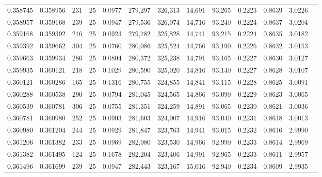 \begin{tabular}{rrrrrrrrrrrrr}
0.358745 & 0.358956 &   231 &  25 &                                     0.0977 & 279,297 & 326,313 &  14,691 &  93,265 & 0.2223 & 0.8639 & 3.0226 \\
0.358957 & 0.359168 &   239 &  25 &                                     0.0947 & 279,536 & 326,074 &  14,716 &  93,240 & 0.2224 & 0.8637 & 3.0204 \\
0.359168 & 0.359392 &   246 &  25 &                                     0.0923 & 279,782 & 325,828 &  14,741 &  93,215 & 0.2224 & 0.8635 & 3.0182 \\
0.359392 & 0.359662 &   304 &  25 &                                     0.0760 & 280,086 & 325,524 &  14,766 &  93,190 & 0.2226 & 0.8632 & 3.0153 \\
0.359663 & 0.359934 &   286 &  25 &                                     0.0804 & 280,372 & 325,238 &  14,791 &  93,165 & 0.2227 & 0.8630 & 3.0127 \\
0.359935 & 0.360121 &   218 &  25 &                                     0.1029 & 280,590 & 325,020 &  14,816 &  93,140 & 0.2227 & 0.8628 & 3.0107 \\
0.360121 & 0.360286 &   165 &  25 &                                     0.1316 & 280,755 & 324,855 &  14,841 &  93,115 & 0.2228 & 0.8625 & 3.0091 \\
0.360288 & 0.360538 &   290 &  25 &                                     0.0794 & 281,045 & 324,565 &  14,866 &  93,090 & 0.2229 & 0.8623 & 3.0065 \\
0.360539 & 0.360781 &   306 &  25 &                                     0.0755 & 281,351 & 324,259 &  14,891 &  93,065 & 0.2230 & 0.8621 & 3.0036 \\
0.360781 & 0.360980 &   252 &  25 &                                     0.0903 & 281,603 & 324,007 &  14,916 &  93,040 & 0.2231 & 0.8618 & 3.0013 \\
0.360980 & 0.361204 &   244 &  25 &                                     0.0929 & 281,847 & 323,763 &  14,941 &  93,015 & 0.2232 & 0.8616 & 2.9990 \\
0.361206 & 0.361382 &   233 &  25 &                                     0.0969 & 282,080 & 323,530 &  14,966 &  92,990 & 0.2233 & 0.8614 & 2.9969 \\
0.361382 & 0.361495 &   124 &  25 &                                     0.1678 & 282,204 & 323,406 &  14,991 &  92,965 & 0.2233 & 0.8611 & 2.9957 \\
0.361496 & 0.361699 &   239 &  25 &                                     0.0947 & 282,443 & 323,167 &  15,016 &  92,940 & 0.2234 & 0.8609 & 2.9935 \\

\end{tabular}
